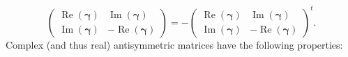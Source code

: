 \documentclass[aps, preprint]{revtex4}
\begin{document}
\begin{equation}\left (\begin{array}{cc}\ensuremath{\operatorname*{Re}} \left (\mathbf{\gamma }\right ) & \ensuremath{\operatorname*{Im}} \left (\mathbf{\gamma }\right ) \\
\ensuremath{\operatorname*{Im}} \left (\mathbf{\gamma }\right ) &  -\ensuremath{\operatorname*{Re}} \left (\mathbf{\gamma }\right )\end{array}\right ) = -\left (\begin{array}{cc}\ensuremath{\operatorname*{Re}} \left (\mathbf{\gamma }\right ) & \ensuremath{\operatorname*{Im}} \left (\mathbf{\gamma }\right ) \\
\ensuremath{\operatorname*{Im}} \left (\mathbf{\gamma }\right ) &  -\ensuremath{\operatorname*{Re}} \left (\mathbf{\gamma }\right )\end{array}\right )^{t}\text{.}
\end{equation}Complex (and thus real) antisymmetric matrices have the following properties:
\end{document}
